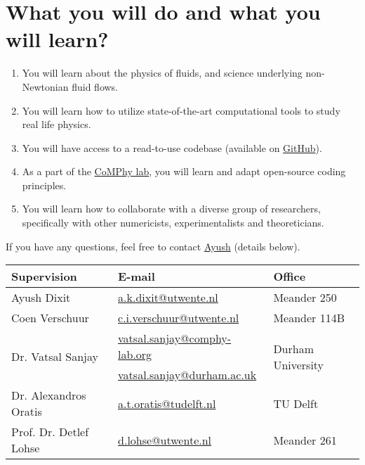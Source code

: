 \documentclass[a4paper,10pt]{article}
\begin{document}
\section*{What you will do and what you will learn?}

\begin{enumerate}
\item You will learn about the physics of fluids, and science underlying non-Newtonian fluid flows. 
\item You will learn how to utilize state-of-the-art computational tools to study real life physics. 
\item You will have access to a read-to-use codebase (available on \href{https://comphy-lab.org/MultiRheoFlow}{GitHub}).
\item As a part of the \href{https://comphy-lab.org}{CoMPhy lab}, you will learn and adapt open-source coding principles. 
\item You will learn how to collaborate with a diverse group of researchers, specifically with other numericists, experimentalists and theoreticians.

\end{enumerate}

If you have any questions, feel free to contact \href{mailto:a.k.dixit@utwente.nl}{Ayush} (details below).
\begin{center}
\begin{tabular}{|l|l|l|}
\hline \textbf{Supervision} & \textbf{E-mail} & \textbf{Office} \\
\hline Ayush Dixit & \href{mailto:a.k.dixit@utwente.nl}{a.k.dixit@utwente.nl} & Meander 250 \\
\hline Coen Verschuur & \href{mailto:c.i.verschuur@utwente.nl}{c.i.verschuur@utwente.nl} & Meander 114B \\
\hline \multirow{2}{*}{Dr. Vatsal Sanjay} & \href{mailto:vatsal.sanjay@comphy-lab.org}{vatsal.sanjay@comphy-lab.org} & \multirow{2}{*}{Durham University} \\
& \href{mailto:vatsal.sanjay@durham.ac.uk}{vatsal.sanjay@durham.ac.uk} & \\
\hline Dr. Alexandros Oratis   & \href{mailto:a.t.oratis@tudelft.nl}{a.t.oratis@tudelft.nl}& TU Delft \\
\hline Prof. Dr. Detlef Lohse & \href{mailto:d.lohse@utwente.nl}{d.lohse@utwente.nl} & Meander 261  \\
\hline
\end{tabular}
\end{center}
\printbibliography
\end{document}
